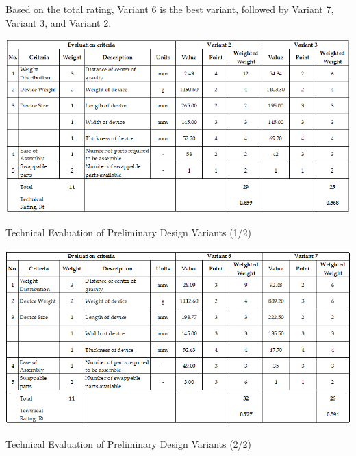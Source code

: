 Based on the total rating, Variant 6 is the best variant, followed by Variant 7, Variant 3, and Variant 2.

\begin{table}[!ht]
    \centering
    \includegraphics[width=0.95\linewidth]{texs/Part1/chapter4/image/tech_eval_1.png}
    \caption{Technical Evaluation of Preliminary Design Variants (1/2)}
    \label{tab:tech_eval_1}
\end{table}

\begin{table}[!ht]
    \centering
    \includegraphics[width=0.95\linewidth]{texs/Part1/chapter4/image/tech_eval_2.png}
    \caption{Technical Evaluation of Preliminary Design Variants (2/2)}
    \label{tab:tech_eval_2}
\end{table}

